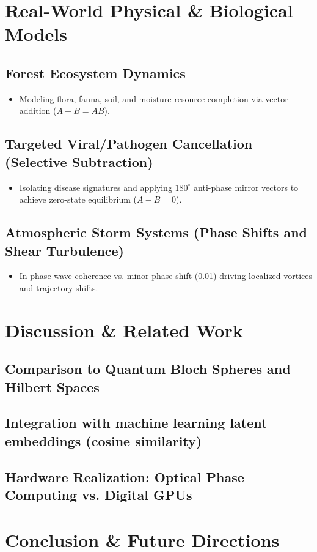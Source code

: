 \documentclass[12pt, a4paper]{article}
\begin{document}
\section{Real-World Physical \& Biological Models}
\subsection{Forest Ecosystem Dynamics}
\begin{itemize}
    \item Modeling flora, fauna, soil, and moisture resource completion via vector addition ($A + B = AB$).
\end{itemize}
\subsection{Targeted Viral/Pathogen Cancellation (Selective Subtraction)}
\begin{itemize}
    \item Isolating disease signatures and applying $180^\circ$ anti-phase mirror
         vectors to achieve zero-state equilibrium ($A - B = 0$).
\end{itemize}
\subsection{Atmospheric Storm Systems (Phase Shifts and Shear Turbulence)}
\begin{itemize}
    \item In-phase wave coherence vs. minor phase shift (0.01) driving localized
         vortices and trajectory shifts.
\end{itemize}

\section{Discussion \& Related Work}
\subsection{Comparison to Quantum Bloch Spheres and Hilbert Spaces}
\subsection{Integration with machine learning latent embeddings (cosine similarity)}
\subsection{Hardware Realization: Optical Phase Computing vs. Digital GPUs}
\section{Conclusion \& Future Directions}
\end{document}
